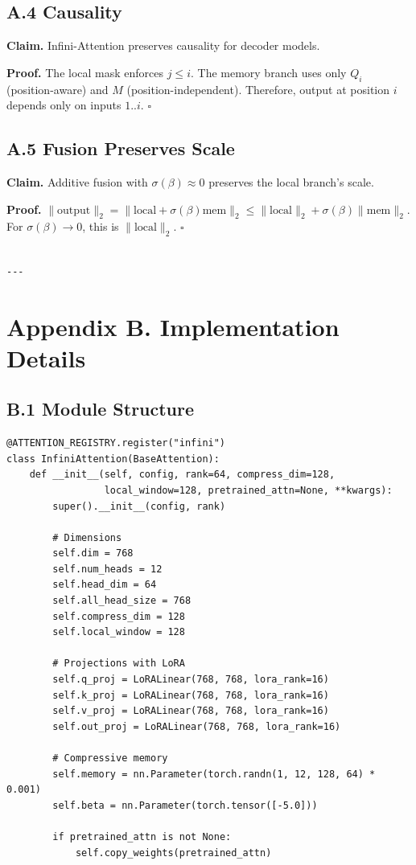 \subsection{A.4 Causality}

\textbf{Claim.} Infini-Attention preserves causality for decoder models.

\textbf{Proof.} The local mask enforces $j \leq i$. The memory branch uses only 
$Q_i$ (position-aware) and $M$ (position-independent). Therefore, output 
at position $i$ depends only on inputs $1..i$. $\square$

\subsection{A.5 Fusion Preserves Scale}

\textbf{Claim.} Additive fusion with $\sigma(\beta) \approx 0$ preserves the 
local branch's scale.

\textbf{Proof.} $\|\text{output}\|_2 = \|\text{local} + \sigma(\beta) \text{mem}\|_2 \leq \|\text{local}\|_2 + \sigma(\beta)\|\text{mem}\|_2$. 
For $\sigma(\beta) \to 0$, this is $\|\text{local}\|_2$. $\square$
\begin{lstlisting}

---
\end{lstlisting}


\section{Appendix B. Implementation Details}

\subsection{B.1 Module Structure}

\begin{lstlisting}
@ATTENTION_REGISTRY.register("infini")
class InfiniAttention(BaseAttention):
    def __init__(self, config, rank=64, compress_dim=128,
                 local_window=128, pretrained_attn=None, **kwargs):
        super().__init__(config, rank)
        
        # Dimensions
        self.dim = 768
        self.num_heads = 12
        self.head_dim = 64
        self.all_head_size = 768
        self.compress_dim = 128
        self.local_window = 128
        
        # Projections with LoRA
        self.q_proj = LoRALinear(768, 768, lora_rank=16)
        self.k_proj = LoRALinear(768, 768, lora_rank=16)
        self.v_proj = LoRALinear(768, 768, lora_rank=16)
        self.out_proj = LoRALinear(768, 768, lora_rank=16)
        
        # Compressive memory
        self.memory = nn.Parameter(torch.randn(1, 12, 128, 64) * 0.001)
        self.beta = nn.Parameter(torch.tensor([-5.0]))
        
        if pretrained_attn is not None:
            self.copy_weights(pretrained_attn)
\end{lstlisting}

